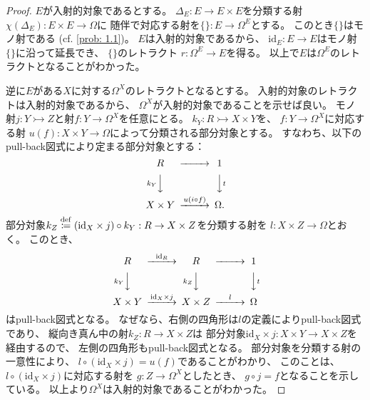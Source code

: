 \documentclass[uplatex]{jsarticle}
\theoremstyle{definition}
\def\id{\mathrm{id}}
\newcommand{\rtot}{\rightarrowtail}
\newcommand{\dfn}{\overset{\mathrm{\tiny def}}{\coloneqq}}
\begin{document}
\begin{proof}
  \(E\)が入射的対象であるとする。
  \(\Delta_E:E\to E\times E\)を分類する射
  \(\chi(\Delta_E):E\times E \to \Omega\)に
  随伴で対応する射を\(\{\}:E\to \Omega^E\)とする。
  このとき\(\{\}\)はモノ射である (cf. \autoref{prob: 1.1})。
  \(E\)は入射的対象であるから、
  \(\id_E:E\to E\)はモノ射\(\{\}\)に沿って延長でき、
  \(\{\}\)のレトラクト
  \(r:\Omega^E\to E\)を得る。
  以上で\(E\)は\(\Omega^E\)のレトラクトとなることがわかった。

  逆に\(E\)がある\(X\)に対する\(\Omega^X\)のレトラクトとなるとする。
  入射的対象のレトラクトは入射的対象であるから、
  \(\Omega^X\)が入射的対象であることを示せば良い。
  モノ射\(j:Y\rtot Z\)と射\(f:Y\to \Omega^X\)を任意にとる。
  \(k_Y:R\rtot X\times Y\)を、
  \(f: Y\to \Omega^X\)に対応する射
  \(u(f): X\times Y\to \Omega\)によって分類される部分対象とする。
  すなわち、以下のpull-back図式により定まる部分対象とする：
  \[
  \begin{CD}
    R @>>> 1 \\
    @V k_Y VV @VV t V \\
    X\times Y @> u(i\circ f) >> \Omega.
  \end{CD}
  \]
  部分対象\(k_Z \dfn (\id_X\times j) \circ k_Y : R\to X\times Z\)を分類する射を
  \(l:X\times Z\to \Omega\)とおく。
  このとき、
  \[
  \begin{CD}
    R @>\id_R>> R @>>> 1 \\
    @V k_Y VV @V k_Z VV @VV t V \\
    X\times Y @> \id_X\times j >> X\times Z @> l >> \Omega
  \end{CD}
  \]
  はpull-back図式となる。
  なぜなら、右側の四角形は\(l\)の定義によりpull-back図式であり、
  縦向き真ん中の射\(k_Z:R\to X\times Z\)は
  部分対象\(\id_X\times j : X\times Y\to X\times Z\)を経由するので、
  左側の四角形もpull-back図式となる。
  部分対象を分類する射の一意性により、
  \(l\circ (\id_X\times j) = u(f)\)であることがわかり、
  このことは、\(l\circ (\id_X\times j)\)に対応する射を
  \(g:Z\to \Omega^X\)としたとき、
  \(g\circ j = f\)となることを示している。
  以上より\(\Omega^X\)は入射的対象であることがわかった。


\end{proof}
\end{document}
